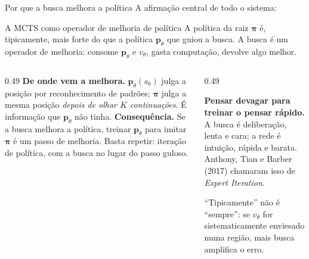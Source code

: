 \documentclass[aspectratio=169, 10pt]{beamer}
\newcommand{\redeval}{v_{\theta}}
\newcommand{\redepol}{\bm{p}_{\theta}}
\newcommand{\raizpol}{\bm{\pi}}
\begin{document}
\begin{frame}{Por que a busca melhora a política}
  \footnotesize
  A afirmação central de todo o sistema:

  \begin{teobox}{A MCTS como operador de melhoria de política}
    A política da raiz $\raizpol$ é, tipicamente, mais forte do que a política
    $\redepol$ que guiou a busca. A busca é um \alert{operador de melhoria}:
    consome $\redepol$ e $\redeval$, gasta computação, devolve algo melhor.
  \end{teobox}

  \begin{columns}[T]
    \begin{column}{0.49\textwidth}
      \textbf{De onde vem a melhora.} $\redepol(s_0)$ julga a posição por
      reconhecimento de padrões; $\raizpol$ julga a mesma posição \emph{depois de
      olhar $K$ continuações}. É informação que $\redepol$ não tinha.
      \smallskip
      \textbf{Consequência.} Se a busca melhora a política, treinar $\redepol$
      para imitar $\raizpol$ é um passo de melhoria. Basta repetir: iteração de
      política, com a busca no lugar do passo guloso.
    \end{column}
    \begin{column}{0.49\textwidth}
      \begin{ideiabox}
        \textbf{Pensar devagar para treinar o pensar rápido.} A busca é
        deliberação, lenta e cara; a rede é intuição, rápida e barata. Anthony,
        Tian e Barber (2017) chamaram isso de \emph{Expert Iteration}.
      \end{ideiabox}
      \begin{alertabox}
        ``Tipicamente'' não é ``sempre'': se $\redeval$ for sistematicamente
        enviesado numa região, mais busca amplifica o erro.
      \end{alertabox}
    \end{column}
  \end{columns}
\end{frame}
\end{document}
